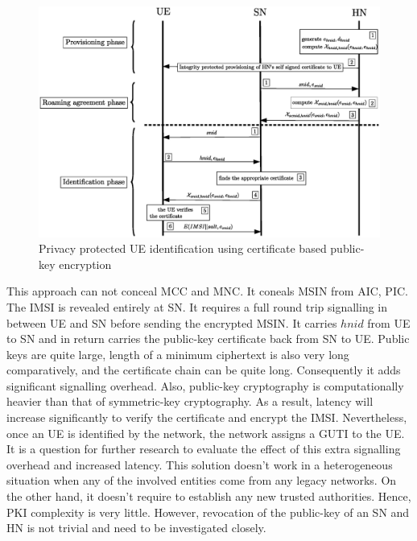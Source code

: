 \documentclass[lnicst,sechang,a4paper]{svmultln}
\begin{document}
\begin{figure}
\begin{center}
  \includegraphics[width=.98\textwidth]{public_key_variation1.eps}
\caption{Privacy protected UE identification using certificate based public-key encryption}
\label{fig:solution_certificate}       %
\end{center}
\end{figure}

This approach can not conceal MCC and MNC. It coneals MSIN from AIC, PIC. The IMSI is revealed entirely at SN. It requires a full round trip signalling in between UE and SN before sending the encrypted MSIN. It carries $hnid$ from UE to SN and in return carries the public-key certificate back from SN to UE. Public keys are quite large, length of a minimum ciphertext is also very long comparatively, and the certificate chain can be quite long. Consequently it adds significant signalling overhead. Also, public-key cryptography is computationally heavier than that of symmetric-key cryptography. As a result, latency will increase significantly to verify the certificate and encrypt the IMSI. Nevertheless, once an UE is identified by the network, the network assigns a GUTI to the UE. It is a question for further research to evaluate the effect of this extra signalling overhead and increased latency. This solution doesn't work in a heterogeneous situation when any of the involved entities come from any legacy networks. On the other hand, it doesn't require to establish any new trusted authorities. Hence, PKI complexity is very little. However, revocation of the public-key of an SN and HN is not trivial and need to be investigated closely.
\end{document}
